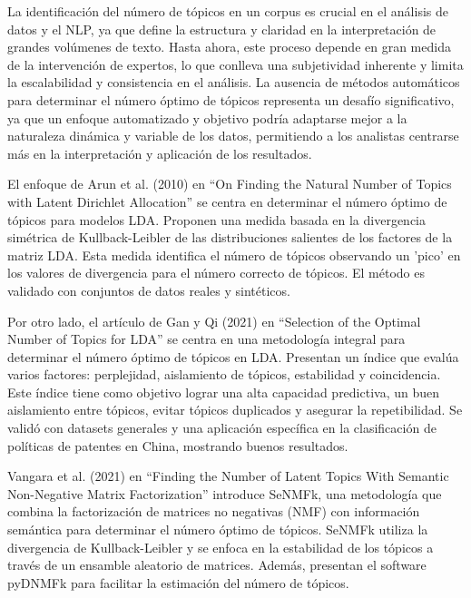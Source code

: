 La identificación del número de tópicos en un corpus es crucial en el análisis de datos y el NLP, ya que define la estructura y claridad en la interpretación de grandes volúmenes de texto. Hasta ahora, este proceso depende en gran medida de la intervención de expertos, lo que conlleva una subjetividad inherente y limita la escalabilidad y consistencia en el análisis. La ausencia de métodos automáticos para determinar el número óptimo de tópicos representa un desafío significativo, ya que un enfoque automatizado y objetivo podría adaptarse mejor a la naturaleza dinámica y variable de los datos, permitiendo a los analistas centrarse más en la interpretación y aplicación de los resultados.

El enfoque de Arun et al. (2010) en ``On Finding the Natural Number of Topics with Latent Dirichlet Allocation'' se centra en determinar el número óptimo de tópicos para modelos LDA. Proponen una medida basada en la divergencia simétrica de Kullback-Leibler de las distribuciones salientes de los factores de la matriz LDA. Esta medida identifica el número de tópicos observando un 'pico' en los valores de divergencia para el número correcto de tópicos. El método es validado con conjuntos de datos reales y sintéticos.

Por otro lado, el art\'iculo de Gan y Qi (2021) en ``Selection of the Optimal Number of Topics for LDA'' se centra en una metodología integral para determinar el número óptimo de tópicos en LDA. Presentan un índice que evalúa varios factores: perplejidad, aislamiento de tópicos, estabilidad y coincidencia. Este índice tiene como objetivo lograr una alta capacidad predictiva, un buen aislamiento entre tópicos, evitar tópicos duplicados y asegurar la repetibilidad. Se validó con datasets generales y una aplicación específica en la clasificación de políticas de patentes en China, mostrando buenos resultados.

Vangara et al. (2021) en ``Finding the Number of Latent Topics With Semantic Non-Negative Matrix Factorization'' introduce SeNMFk, una metodología que combina la factorización de matrices no negativas (NMF) con información semántica para determinar el número óptimo de tópicos. SeNMFk utiliza la divergencia de Kullback-Leibler y se enfoca en la estabilidad de los tópicos a través de un ensamble aleatorio de matrices. Además, presentan el software pyDNMFk para facilitar la estimación del número de tópicos.

